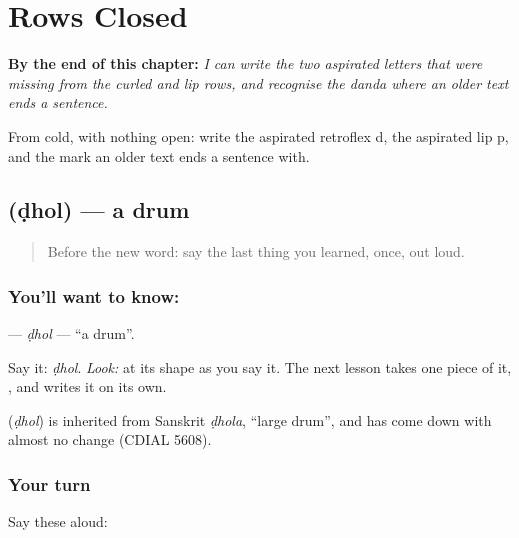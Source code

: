 
\chapter{Rows Closed}
\label{ch:mr-oli-purna}

\begin{chapteropening}
\textbf{By the end of this chapter:} \emph{I can write the two aspirated letters that were missing from the curled and lip rows, and recognise the danda where an older text ends a sentence.}

From cold, with nothing open: write the aspirated retroflex d, the aspirated lip p, and the mark an older text ends a sentence with.
\end{chapteropening}

\section[\texorpdfstring{\mr{ढोल} (ḍhol)}{ढोल (ḍhol)}]{ (ḍhol) — a drum}

\label{lesson:MR-C64-dhol}



\begin{quote}
Before the new word: say the last thing you learned, once, out loud.
\end{quote}

\subsection*{You'll want to know: }
\textbf{} — \emph{ḍhol} — \textquotedblleft{}a drum\textquotedblright{}.

Say it: \emph{ḍhol}. \emph{Look:} at its shape as you say it. The next lesson takes one piece of it, \textbf{}, and writes it on its own.

\begin{cousinweb}
\textbf{} (\emph{ḍhol}) is inherited from Sanskrit \emph{ḍhola}, \textquotedblleft{}large drum\textquotedblright{}, and has come down with almost no change (CDIAL 5608).
\end{cousinweb}

\subsection*{Your turn}
Say these aloud:

